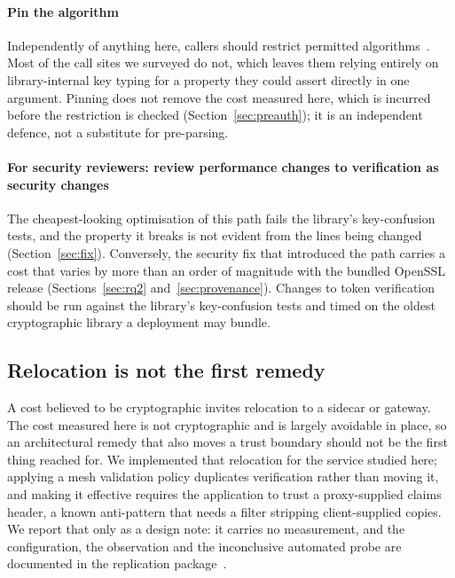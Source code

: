 \documentclass[preprint,12pt,authoryear]{elsarticle}
\begin{document}
\paragraph{Pin the algorithm} Independently of anything here, callers should
restrict permitted algorithms~\citep{rfc8725}. Most of the call sites we surveyed
do not, which leaves them relying entirely on library-internal key typing for a
property they could assert directly in one argument. Pinning does not remove
the cost measured here, which is incurred before the restriction is checked
(Section~\ref{sec:preauth}); it is an independent defence, not a substitute
for pre-parsing.

\paragraph{For security reviewers: review performance changes to verification
as security changes} The cheapest-looking optimisation of this path fails the
library's key-confusion tests, and the property it breaks is not evident from
the lines being changed (Section~\ref{sec:fix}). Conversely, the security fix
that introduced the path carries a cost that varies by more than an order of
magnitude with the bundled OpenSSL release (Sections~\ref{sec:rq2}
and~\ref{sec:provenance}). Changes to token verification should be run against
the library's key-confusion tests and timed on the oldest cryptographic library
a deployment may bundle.

\subsection{Relocation is not the first remedy}\label{sec:offload}

A cost believed to be cryptographic invites relocation to a sidecar or gateway.
The cost measured here is not cryptographic and is largely avoidable in place,
so an architectural remedy that also moves a trust boundary should not be the
first thing reached for. We implemented that relocation for the service
studied here; applying a mesh validation policy duplicates verification rather
than moving it, and making it effective requires the application to trust a
proxy-supplied claims header, a known anti-pattern that needs a filter
stripping client-supplied copies. We report that only as a design note: it
carries no measurement, and the configuration, the observation and the
inconclusive automated probe are documented in the replication
package~\citep{artifact2026}.
\end{document}
